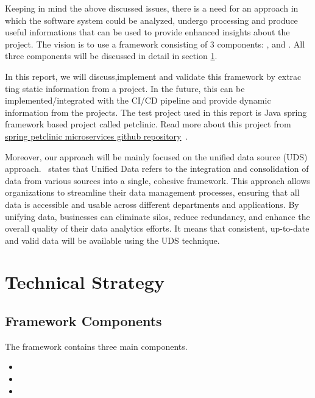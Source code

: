 Keeping in mind the above discussed issues, there is a need for an approach in which the software system could be analyzed, undergo processing and produce useful informations that can be used to provide enhanced insights about the project. The vision is to use a framework consisting of 3 components: 
,  and . All three components will be discussed in detail in section{ }\ref{sec:tech-strategy}.

In this report, we will discuss,implement and validate this framework by extrac
ting static information from a project. In the future, this can be implemented/integrated with the CI/CD pipeline and provide dynamic information from the projects. The test project used in this report is Java spring framework based project called petclinic. Read more about this project from \href{https://github.com/spring-petclinic/spring-petclinic-microservices}
{spring petclinic microservices github repository}~\citep{spring-petclinic}.

Moreover, our approach will be mainly focused on the unified data source (UDS) approach.~\citep{unifiedData2025} states that Unified Data refers to the integration and consolidation of data from various sources into a single, cohesive framework. This approach allows organizations to streamline their data management processes, ensuring that all data is accessible and usable across different departments and applications. By unifying data, businesses can eliminate silos, reduce redundancy, and enhance the overall quality of their data analytics efforts. It means that consistent, up-to-date and valid data will be available using the UDS technique.


\section{Technical Strategy}\label{sec:tech-strategy}

\subsection{Framework Components}\label{subsec:framework-components}

The framework contains three main components.
\begin{itemize}
    \item {}
    \item {}
    \item {}
\end{itemize}



